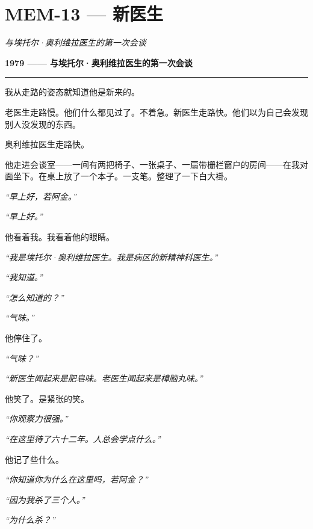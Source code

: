 \section*{\textbf{MEM-13} --- 新医生}

\noindent \textit{与埃托尔·奥利维拉医生的第一次会谈}

\noindent \textbf{1979 —— 与埃托尔·奥利维拉医生的第一次会谈}

\vspace{0.5em}\noindent\rule{\textwidth}{0.5pt}\vspace{0.5em}

\noindent 我从走路的姿态就知道他是新来的。

\noindent 老医生走路慢。他们什么都见过了。不着急。新医生走路快。他们以为自己会发现别人没发现的东西。

\noindent 奥利维拉医生走路快。

\noindent 他走进会谈室——一间有两把椅子、一张桌子、一扇带栅栏窗户的房间——在我对面坐下。在桌上放了一个本子。一支笔。整理了一下白大褂。

\noindent \textit{“早上好，若阿金。”}

\noindent \textit{“早上好。”}

\noindent 他看着我。我看着他的眼睛。

\noindent \textit{“我是埃托尔·奥利维拉医生。我是病区的新精神科医生。”}

\noindent \textit{“我知道。”}

\noindent \textit{“怎么知道的？”}

\noindent \textit{“气味。”}

\noindent 他停住了。

\noindent \textit{“气味？”}

\noindent \textit{“新医生闻起来是肥皂味。老医生闻起来是樟脑丸味。”}

\noindent 他笑了。是紧张的笑。

\noindent \textit{“你观察力很强。”}

\noindent \textit{“在这里待了六十二年。人总会学点什么。”}

\noindent 他记了些什么。

\noindent \textit{“你知道你为什么在这里吗，若阿金？”}

\noindent \textit{“因为我杀了三个人。”}

\noindent \textit{“为什么杀？”}

